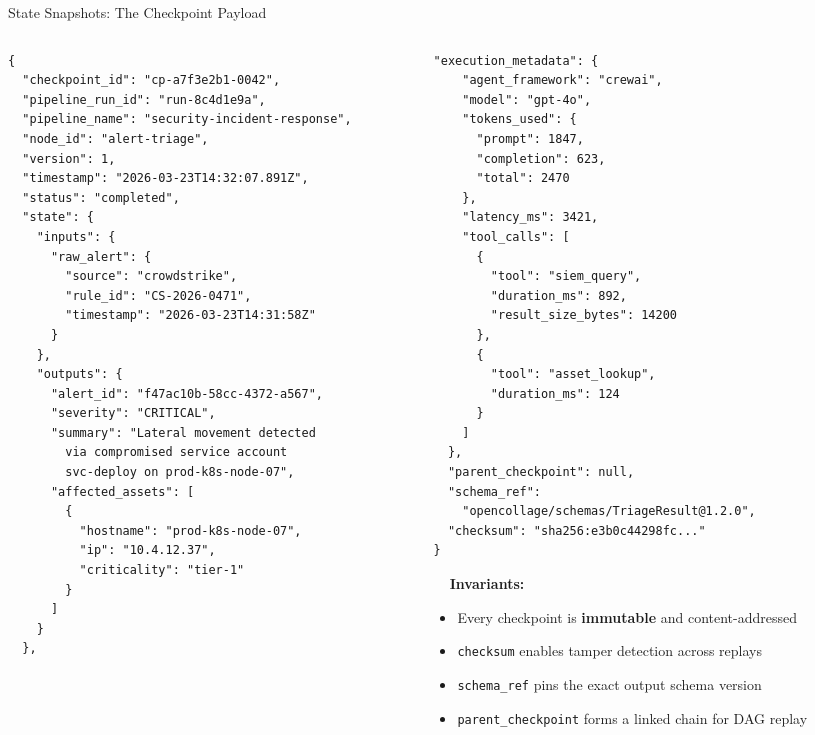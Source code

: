 \begin{frame}[fragile]{State Snapshots: The Checkpoint Payload}
  \vspace{-0.2cm}
  \begin{columns}[T]
    \begin{column}{0.52\textwidth}
      \begin{lstlisting}[style=jsonstyle,basicstyle=\ttfamily\fontsize{4}{4.8}\selectfont,title={\tiny\bfseries State Checkpoint (after alert-triage)}]
{
  "checkpoint_id": "cp-a7f3e2b1-0042",
  "pipeline_run_id": "run-8c4d1e9a",
  "pipeline_name": "security-incident-response",
  "node_id": "alert-triage",
  "version": 1,
  "timestamp": "2026-03-23T14:32:07.891Z",
  "status": "completed",
  "state": {
    "inputs": {
      "raw_alert": {
        "source": "crowdstrike",
        "rule_id": "CS-2026-0471",
        "timestamp": "2026-03-23T14:31:58Z"
      }
    },
    "outputs": {
      "alert_id": "f47ac10b-58cc-4372-a567",
      "severity": "CRITICAL",
      "summary": "Lateral movement detected
        via compromised service account
        svc-deploy on prod-k8s-node-07",
      "affected_assets": [
        {
          "hostname": "prod-k8s-node-07",
          "ip": "10.4.12.37",
          "criticality": "tier-1"
        }
      ]
    }
  },
      \end{lstlisting}
    \end{column}
    \begin{column}{0.48\textwidth}
      \begin{lstlisting}[style=jsonstyle,basicstyle=\ttfamily\fontsize{4}{4.8}\selectfont,title={\tiny\bfseries State Checkpoint (cont.)}]
  "execution_metadata": {
    "agent_framework": "crewai",
    "model": "gpt-4o",
    "tokens_used": {
      "prompt": 1847,
      "completion": 623,
      "total": 2470
    },
    "latency_ms": 3421,
    "tool_calls": [
      {
        "tool": "siem_query",
        "duration_ms": 892,
        "result_size_bytes": 14200
      },
      {
        "tool": "asset_lookup",
        "duration_ms": 124
      }
    ]
  },
  "parent_checkpoint": null,
  "schema_ref":
    "opencollage/schemas/TriageResult@1.2.0",
  "checksum": "sha256:e3b0c44298fc..."
}
      \end{lstlisting}

      \vspace{0.1cm}

      \fontsize{5}{6}\selectfont
      \textbf{\ \ Invariants:}
      \begin{itemize}
        \setlength{\itemsep}{0pt}
        \item Every checkpoint is \textbf{immutable} and content-addressed
        \item \texttt{checksum} enables tamper detection across replays
        \item \texttt{schema\_ref} pins the exact output schema version
        \item \texttt{parent\_checkpoint} forms a linked chain for DAG replay
      \end{itemize}
    \end{column}
  \end{columns}
\end{frame}
